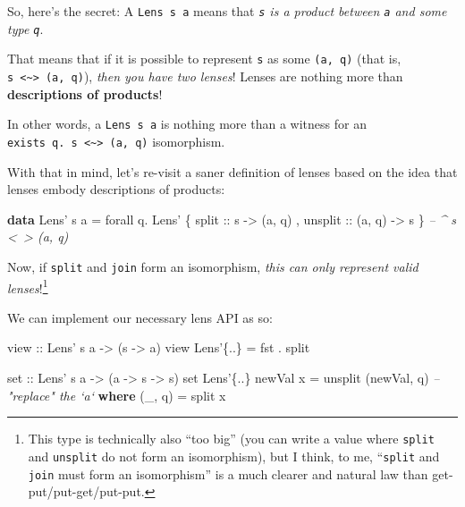 \documentclass[]{article}
\newenvironment{Shaded}{}{}
\newcommand{\CommentTok}[1]{\textcolor[rgb]{0.38,0.63,0.69}{\textit{#1}}}
\newcommand{\DataTypeTok}[1]{\textcolor[rgb]{0.56,0.13,0.00}{#1}}
\newcommand{\FunctionTok}[1]{\textcolor[rgb]{0.02,0.16,0.49}{#1}}
\newcommand{\KeywordTok}[1]{\textcolor[rgb]{0.00,0.44,0.13}{\textbf{#1}}}
\newcommand{\NormalTok}[1]{#1}
\newcommand{\OtherTok}[1]{\textcolor[rgb]{0.00,0.44,0.13}{#1}}
\begin{document}
So, here's the secret: A \texttt{Lens\textquotesingle{}\ s\ a} means that
\emph{\texttt{s} is a product between \texttt{a} and some type \texttt{q}}.

That means that if it is possible to represent \texttt{s} as some
\texttt{(a,\ q)} (that is,
\texttt{s\ \textless{}\textasciitilde{}\textgreater{}\ (a,\ q)}), \emph{then you
have two lenses}! Lenses are nothing more than \textbf{descriptions of
products}!

In other words, a \texttt{Lens\textquotesingle{}\ s\ a} is nothing more than a
witness for an
\texttt{exists\ q.\ s\ \textless{}\textasciitilde{}\textgreater{}\ (a,\ q)}
isomorphism.

With that in mind, let's re-visit a saner definition of lenses based on the idea
that lenses embody descriptions of products:

\begin{Shaded}
\begin{Highlighting}[]
\KeywordTok{data} \DataTypeTok{Lens'}\NormalTok{ s a }\FunctionTok{=}\NormalTok{ forall q}\FunctionTok{.}
                 \DataTypeTok{Lens'}\NormalTok{ \{}\OtherTok{ split   ::}\NormalTok{ s }\OtherTok{->}\NormalTok{ (a, q)}
\NormalTok{                       ,}\OtherTok{ unsplit ::}\NormalTok{ (a, q) }\OtherTok{->}\NormalTok{ s}
\NormalTok{                       \}    }\CommentTok{-- ^ s <~> (a, q)}
\end{Highlighting}
\end{Shaded}

Now, if \texttt{split} and \texttt{join} form an isomorphism, \emph{this can
only represent valid lenses}!\footnote{This type is technically also ``too big''
  (you can write a value where \texttt{split} and \texttt{unsplit} do not form
  an isomorphism), but I think, to me, ``\texttt{split} and \texttt{join} must
  form an isomorphism'' is a much clearer and natural law than
  get-put/put-get/put-put.}

We can implement our necessary lens API as so:

\begin{Shaded}
\begin{Highlighting}[]
\OtherTok{view ::} \DataTypeTok{Lens'}\NormalTok{ s a }\OtherTok{->}\NormalTok{ (s }\OtherTok{->}\NormalTok{ a)}
\NormalTok{view }\DataTypeTok{Lens'}\NormalTok{\{}\FunctionTok{..}\NormalTok{\} }\FunctionTok{=}\NormalTok{ fst }\FunctionTok{.}\NormalTok{ split}

\OtherTok{set ::} \DataTypeTok{Lens'}\NormalTok{ s a }\OtherTok{->}\NormalTok{ (a }\OtherTok{->}\NormalTok{ s }\OtherTok{->}\NormalTok{ s)}
\NormalTok{set }\DataTypeTok{Lens'}\NormalTok{\{}\FunctionTok{..}\NormalTok{\} newVal x }\FunctionTok{=}\NormalTok{ unsplit (newVal, q)      }\CommentTok{-- "replace" the `a`}
  \KeywordTok{where}
\NormalTok{    (_, q) }\FunctionTok{=}\NormalTok{ split x}
\end{Highlighting}
\end{Shaded}
\end{document}
